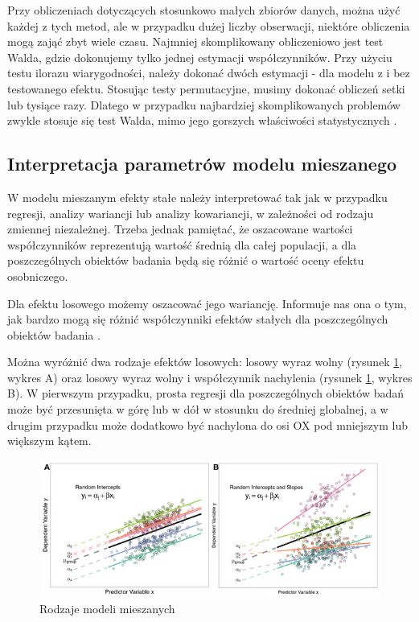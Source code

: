 \documentclass[12pt]{mwbk}
\theoremstyle{plain}
\theoremstyle{definition}
\theoremstyle{remark}
\newcommand\zrodlo[1]{\par\vspace{-3mm}{\small\textit{Źródło: }#1 }}
\begin{document}
Przy obliczeniach dotyczących stosunkowo małych zbiorów danych, można użyć każdej z tych metod, ale w przypadku dużej liczby obserwacji, niektóre obliczenia mogą zająć zbyt wiele czasu. Najmniej skomplikowany obliczeniowo jest test Walda, gdzie dokonujemy tylko jednej estymacji współczynników. Przy użyciu testu ilorazu wiarygodności, należy dokonać dwóch estymacji - dla modelu z i bez testowanego efektu. Stosując testy permutacyjne, musimy dokonać obliczeń setki lub tysiące razy. Dlatego w przypadku najbardziej skomplikowanych problemów zwykle stosuje się test Walda, mimo jego gorszych właściwości statystycznych \cite{biecek}.


\subsection{Interpretacja parametrów modelu mieszanego}
W modelu mieszanym efekty stałe należy interpretować tak jak w przypadku regresji, analizy wariancji lub analizy kowariancji, w zależności od rodzaju zmiennej niezależnej. Trzeba jednak pamiętać, że oszacowane wartości współczynników reprezentują wartość średnią dla całej populacji, a dla poszczególnych obiektów badania będą się różnić o wartość oceny efektu osobniczego.

Dla efektu losowego możemy oszacować jego wariancję. Informuje nas ona o tym, jak bardzo mogą się różnić współczynniki efektów stałych dla poszczególnych obiektów badania
\cite{experimental}.

Można wyróżnić dwa rodzaje efektów losowych: losowy wyraz wolny (rysunek \ref{fig:random_types}, wykres A) oraz losowy wyraz wolny i współczynnik nachylenia (rysunek \ref{fig:random_types}, wykres B). W pierwszym przypadku, prosta regresji dla poszczególnych obiektów badań może być przesunięta w górę lub w dół w stosunku do średniej globalnej, a w drugim przypadku może dodatkowo być nachylona do osi OX pod mniejszym lub większym kątem.

\begin{figure}[htbp]
	\centering
	\includegraphics[width=\linewidth]{rys/random_types.jpg}
	\caption{Rodzaje modeli mieszanych}
	\label{fig:random_types}
	\zrodlo{\cite{brief}}
\end{figure}
\end{document}
